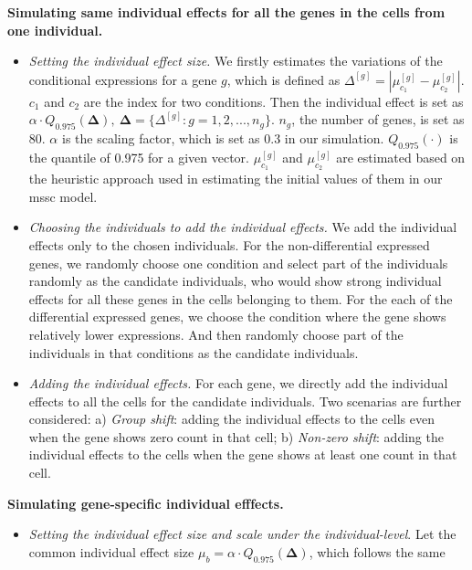 \documentclass[fleqn,10pt]{wlscirep}
\newcommand{\myvec}[1]{\boldsymbol{#1}}
\begin{document}
\begin{itemize}
  {\bf Simulating same individual effects for all the genes in the
    cells from one individual.}
  \begin{itemize}
    \item {\it Setting the individual effect size.} We firstly
      estimates the variations of the conditional expressions for
      a gene $g$, which is defined as
      $\Delta^{[g]} = |\mu_{c_1}^{[g]}-\mu_{c_2}^{[g]}|$. $c_1$ and $c_2$ are the index for
      two conditions. Then the individual effect is set as $\alpha
      \cdot Q_{0.975}(\myvec{\Delta}),~\myvec{\Delta} = \{\Delta^{[g]}:
      g=1, 2, ..., n_g\}$. $n_g$, the number of genes, is set as
      80. $\alpha$ is the scaling factor, which is set as 0.3 in our
      simulation. $Q_{0.975}(\cdot)$ is the quantile of
      0.975 for a given vector. $\mu_{c_1}^{[g]}$ and
      $\mu_{c_2}^{[g]}$ are estimated based on the heuristic approach
      used in estimating the initial values of them in our mssc model.
    \item {\it Choosing the individuals to add the individual
        effects.} We add the individual effects only to the chosen
      individuals. For the non-differential expressed genes, we
      randomly choose one condition and select part of the individuals
      randomly as 
      the candidate individuals, who would show strong individual
      effects for all these genes in the cells belonging to them. For
      the each of the differential expressed genes, we choose the
      condition where the gene shows relatively lower expressions. And
      then randomly choose part of the individuals in that conditions
      as the candidate individuals.
    \item
      {\it Adding the individual effects.} For each gene, we directly add the
      individual effects to all the cells for the candidate
      individuals. Two scenarias are further considered: a) {\it Group
        shift}: adding the individual effects to the cells even when the gene shows zero
      count in that cell; b) {\it Non-zero shift}: adding the
      individual effects to the cells when the gene shows at least one
      count in that cell.
    \end{itemize}
    {\bf Simulating gene-specific individual efffects.}
    \begin{itemize}
    \item
      {\it Setting the individual effect size and scale under the
        individual-level}. Let the common 
      individual effect size $\mu_b = \alpha
      \cdot Q_{0.975}(\myvec{\Delta})$, which follows the same

\end{itemize}
\end{itemize}
\end{document}
